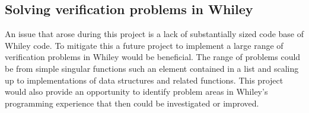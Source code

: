 \subsection{Solving verification problems in Whiley}

An issue that arose during this project is a lack of substantially sized code base
of Whiley code.
To mitigate this a future project to implement a large range of 
verification problems in Whiley would be beneficial.
The range of problems could be from simple singular functions such an element
contained in a list and scaling up to implementations of data structures and related
functions.
This project would also provide an opportunity to identify problem areas
in Whiley's programming experience that then could be investigated or improved.
